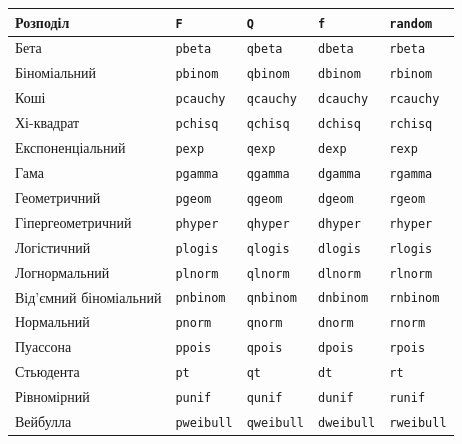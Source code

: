 \documentclass[a4paper, 12pt]{article}
\begin{document}
\begin{table}[H]
	\centering
	\begin{tabular}{|l|l|l|l|l|}
		\hline
		Розподіл & \verb|F| & \verb|Q| & \verb|f| & \verb|random| \\ \hline
		Бета & \verb|pbeta| & \verb|qbeta| & \verb|dbeta| & \verb|rbeta| \\ \hline
		Біноміальний & \verb|pbinom| & \verb|qbinom| & \verb|dbinom| & \verb|rbinom| \\ \hline
		Коші & \verb|pcauchy| & \verb|qcauchy| & \verb|dcauchy| & \verb|rcauchy| \\ \hline
		Хі-квадрат & \verb|pchisq| & \verb|qchisq| & \verb|dchisq| & \verb|rchisq| \\ \hline
		Експоненціальний & \verb|pexp| & \verb|qexp| & \verb|dexp| & \verb|rexp| \\ \hline
		Гама & \verb|pgamma| & \verb|qgamma| & \verb|dgamma| & \verb|rgamma| \\ \hline
		Геометричний & \verb|pgeom| & \verb|qgeom| & \verb|dgeom| & \verb|rgeom| \\ \hline
		Гіпергеометричний & \verb|phyper| & \verb|qhyper| & \verb|dhyper| & \verb|rhyper| \\ \hline
		Логістичний & \verb|plogis| & \verb|qlogis| & \verb|dlogis| & \verb|rlogis| \\ \hline
		Логнормальний & \verb|plnorm| & \verb|qlnorm| & \verb|dlnorm| & \verb|rlnorm| \\ \hline
		Від’ємний біноміальний & \verb|pnbinom| & \verb|qnbinom| & \verb|dnbinom| & \verb|rnbinom| \\ \hline
		Нормальний & \verb|pnorm| & \verb|qnorm| & \verb|dnorm| & \verb|rnorm| \\ \hline
		Пуассона & \verb|ppois| & \verb|qpois| & \verb|dpois| & \verb|rpois| \\ \hline
		Стьюдента & \verb|pt| & \verb|qt| & \verb|dt| & \verb|rt| \\ \hline
		Рівномірний & \verb|punif| & \verb|qunif| & \verb|dunif| & \verb|runif| \\ \hline
		Вейбулла & \verb|pweibull| & \verb|qweibull| & \verb|dweibull| & \verb|rweibull| \\ \hline
	\end{tabular}
\end{table}
\end{document}
